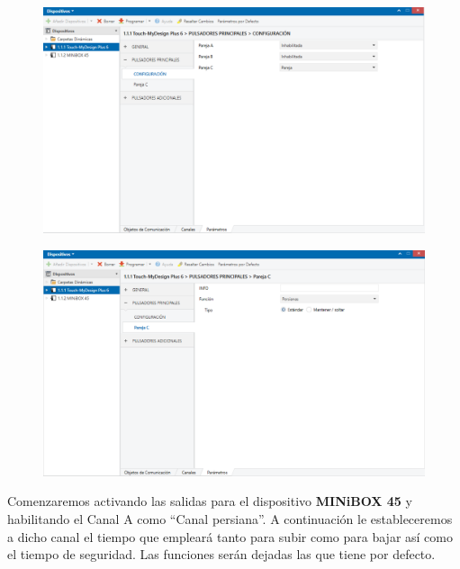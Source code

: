 \documentclass[10pt]{article}
\begin{document}
\begin{figure}[H]
	\begin{center}
	 		\includegraphics[width = 1.00\textwidth]{Imagenes/img36}
	\end{center} 
\end{figure}

\begin{figure}[H]
	\begin{center}
	 		\includegraphics[width = 1.00\textwidth]{Imagenes/img37}
	\end{center} 
\end{figure}

Comenzaremos activando las salidas para el dispositivo \textbf{MINiBOX 45} y habilitando el Canal A como ``Canal persiana''. A continuación le estableceremos a dicho canal el tiempo que empleará tanto para subir como para bajar así como el tiempo de seguridad. Las funciones serán dejadas las que tiene por defecto. \\
\end{document}
